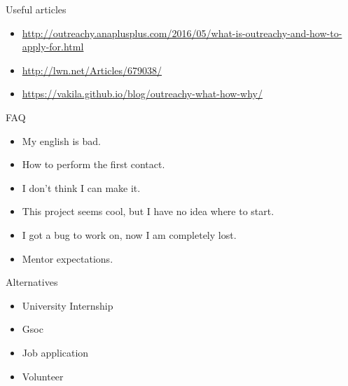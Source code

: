 \documentclass[pdf]{beamer}
\begin{document}
\begin{frame}{Useful articles}
  \begin{itemize}
    \item \url{http://outreachy.anaplusplus.com/2016/05/what-is-outreachy-and-how-to-apply-for.html}
    \item \url{http://lwn.net/Articles/679038/}
    \item \url{https://vakila.github.io/blog/outreachy-what-how-why/}
  \end{itemize}
\end{frame}

\begin{frame}{FAQ}
  \begin{itemize}
    \item My english is bad.
    \item How to perform the first contact.
    \item I don't think I can make it.
    \item This project seems cool, but I have no idea where to start.
    \item I got a bug to work on, now I am completely lost.
    \item Mentor expectations.
  \end{itemize}
\end{frame}

\begin{frame}{Alternatives}
  \begin{itemize}
    \item University Internship
    \item Gsoc
    \item Job application
    \item Volunteer
  \end{itemize}
\end{frame}
\end{document}
